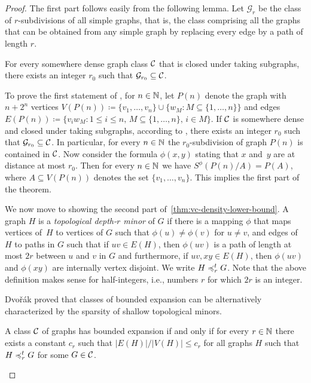\begin{proof}
The first part follows easily from the following lemma.
Let $\mathcal{G}_r$ be the class of $r$-subdivisions of all 
simple graphs, that is, the class comprising
all the graphs that can be obtained from any simple graph by replacing every edge by a path of
length $r$.

\begin{lemma}\label{lem:lower-nd}
For every somewhere dense graph class $\mathcal{C}$ that is closed 
under taking subgraphs, there
exists an integer $r_0$ such that $\mathcal{G}_{r_0}\subseteq \mathcal{C}$.
\end{lemma}

To prove the first statement of , 
for $n\in \mathbb{N}$, let $P(n)$ denote the graph with $n+2^n$ 
vertices $V(P(n))\coloneqq \{v_1,\ldots, v_n\}\cup \{w_M \colon M\subseteq \{1,\ldots, n\}\}$ and edges $E(P(n))\coloneqq \{v_iw_M \colon 1\leq i\leq n,\, M\subseteq \{1,\ldots, n\},\, i\in M\}$. 
If $\mathcal{C}$ is somewhere dense and closed under taking subgraphs, 
according to , there exists an integer $r_0$ 
such that $\mathcal{G}_{r_0}\subseteq \mathcal{C}$. In particular, for every $n\in \mathbb{N}$ the $r_0$-subdivision of graph $P(n)$ is contained in $\mathcal{C}$.
Now consider 
the formula $\phi(x,y)$ stating that $x$ and~$y$ are at distance at most $r_0$. Then for every $n\in \mathbb{N}$ we have 
$S^\phi(P(n)/A)=P(A)$, where $A\subseteq V(P(n))$ denotes the set $\{v_1,\ldots, v_n\}$. This implies the first part
of the theorem. 


\medskip
We now move to showing the  second part of~\cref{thm:vc-density-lower-bound}.
A graph $H$ is a \emph{topological depth-$r$ minor} of $G$ if
there is a mapping $\phi$ that maps vertices of~$H$ to 
vertices of $G$ such that $\phi(u)\neq \phi(v)$ for 
$u\neq v$, and edges of $H$ to paths in 
$G$ such that if $uv\in E(H)$, then $\phi(uv)$
is a path of length at most $2r$ between $u$ and $v$ in 
$G$ and furthermore, if $uv, xy\in E(H)$, then 
$\phi(uv)$ and $\phi(xy)$ are internally vertex
disjoint. We write $H\preccurlyeq_r^t G$. 
Note that the above definition makes sense for 
half-integers, i.e., numbers $r$ for which $2r$ is an integer.

Dvo\v{r}\'ak proved that classes of bounded expansion can be alternatively characterized by the sparsity of shallow topological minors.

\begin{lemma}\label{lem:top-bnd-exp}
A class $\mathcal{C}$ of graphs has bounded expansion if and only 
if for every $r\in \mathbb{N}$ there exists a constant $c_r$ such that $|E(H)|/|V(H)|\leq c_r$ for all graphs $H$ such that $H\preccurlyeq_r^tG $ for some $G\in \mathcal{C}$.
\end{lemma}


\end{proof}
